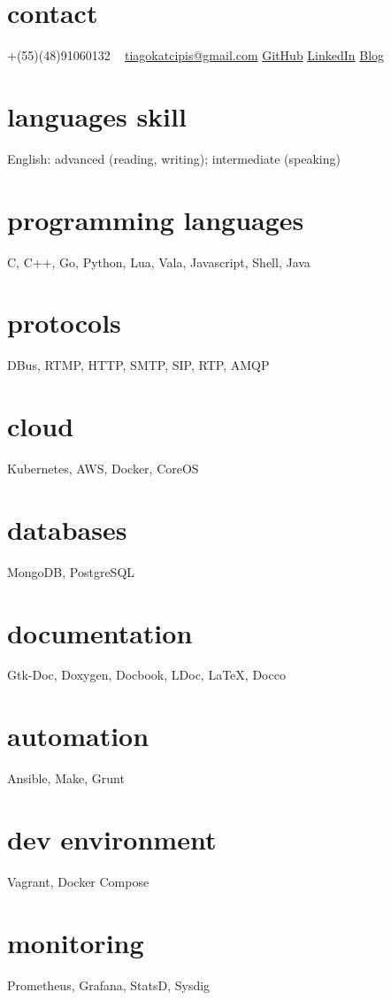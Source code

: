 \documentclass[]{friggeri-cv} %
\begin{document}


\begin{aside} %
\section{contact}
+(55)(48)91060132
~
\href{mailto:tiagokatcipis@gmail.com}{tiagokatcipis@gmail.com}
\href{https://github.com/katcipis}{GitHub}
\href{http://www.linkedin.com/pub/tiago-katcipis/1b/273/8b0}{LinkedIn}
\href{http://katcipis.github.io/}{Blog}
\section{languages skill}
English: advanced (reading, writing); intermediate (speaking)
\section{programming languages}
C, C++, Go, Python, Lua, Vala, Javascript, Shell, Java
\section{protocols}
DBus, RTMP, HTTP, SMTP, SIP, RTP, AMQP
\section{cloud}
Kubernetes, AWS, Docker, CoreOS
\section{databases}
MongoDB, PostgreSQL
\section{documentation}
Gtk-Doc, Doxygen, Docbook, LDoc, LaTeX, Docco
\section{automation}
Ansible, Make, Grunt
\section{dev environment}
Vagrant, Docker Compose
\section{monitoring}
Prometheus, Grafana, StatsD, Sysdig
\end{aside}
\end{document}
